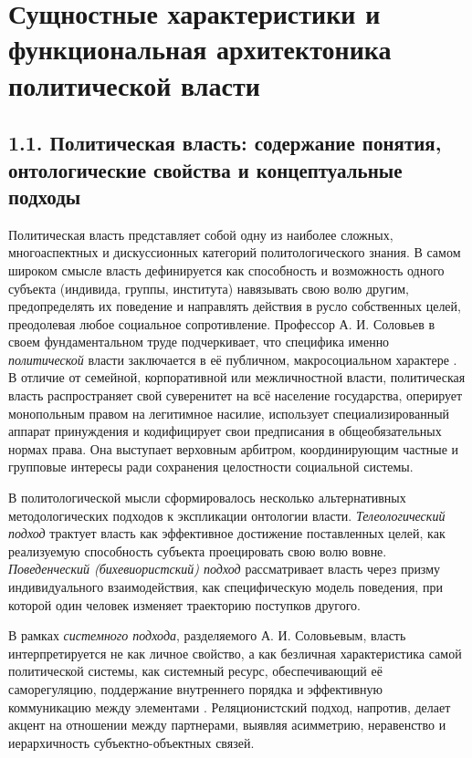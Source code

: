 \section{Сущностные характеристики и функциональная архитектоника политической власти}

\subsection{1.1. Политическая власть: содержание понятия, онтологические свойства и концептуальные подходы}

Политическая власть представляет собой одну из наиболее сложных, многоаспектных и дискуссионных категорий политологического знания. В самом широком смысле власть дефинируется как способность и возможность одного субъекта (индивида, группы, института) навязывать свою волю другим, предопределять их поведение и направлять действия в русло собственных целей, преодолевая любое социальное сопротивление. Профессор А. И. Соловьев в своем фундаментальном труде подчеркивает, что специфика именно \textit{политической} власти заключается в её публичном, макросоциальном характере \cite{Solovyev}. В отличие от семейной, корпоративной или межличностной власти, политическая власть распространяет свой суверенитет на всё население государства, оперирует монопольным правом на легитимное насилие, использует специализированный аппарат принуждения и кодифицирует свои предписания в общеобязательных нормах права. Она выступает верховным арбитром, координирующим частные и групповые интересы ради сохранения целостности социальной системы.

В политологической мысли сформировалось несколько альтернативных методологических подходов к экспликации онтологии власти. \textit{Телеологический подход} трактует власть как эффективное достижение поставленных целей, как реализуемую способность субъекта проецировать свою волю вовне. \textit{Поведенческий (бихевиористский) подход} рассматривает власть через призму индивидуального взаимодействия, как специфическую модель поведения, при которой один человек изменяет траекторию поступков другого. 

В рамках \textit{системного подхода}, разделяемого А. И. Соловьевым, власть интерпретируется не как личное свойство, а как безличная характеристика самой политической системы, как системный ресурс, обеспечивающий её саморегуляцию, поддержание внутреннего порядка и эффективную коммуникацию между элементами \cite{Solovyev}. Реляционистский подход, напротив, делает акцент на отношении между партнерами, выявляя асимметрию, неравенство и иерархичность субъектно-объектных связей.

